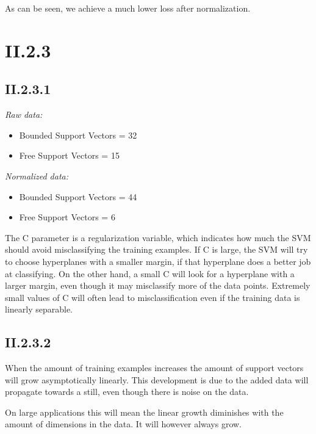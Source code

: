 \documentclass[12pt, a4paper]{article}
\begin{document}
As can be seen, we achieve a much lower loss after normalization.

\section*{II.2.3}

\subsection{II.2.3.1}

\textit{Raw data:}
\begin{itemize}
	\item Bounded Support Vectors = 32
	\item Free Support Vectors = 15
\end{itemize}

\textit{Normalized data:}
\begin{itemize}
	\item Bounded Support Vectors = 44
	\item Free Support Vectors = 6
\end{itemize}

The C parameter is a regularization variable, which indicates how much the SVM should avoid misclassifying the training examples. If C is large, the SVM will try to choose hyperplanes with a smaller margin, if that hyperplane does a better job at classifying. On the other hand, a small C will look for a hyperplane with a larger margin, even though it may misclassify more of the data points. Extremely small values of C will often lead to misclassification even if the training data is linearly separable.

\subsection{II.2.3.2}

When the amount of training examples increases the amount of support vectors will grow asymptotically linearly. This development is due to the added data will propagate towards a still, even though there is noise on the data.

On large applications this will mean the linear growth diminishes with the amount of dimensions in the data. It will however always grow.
\end{document}
